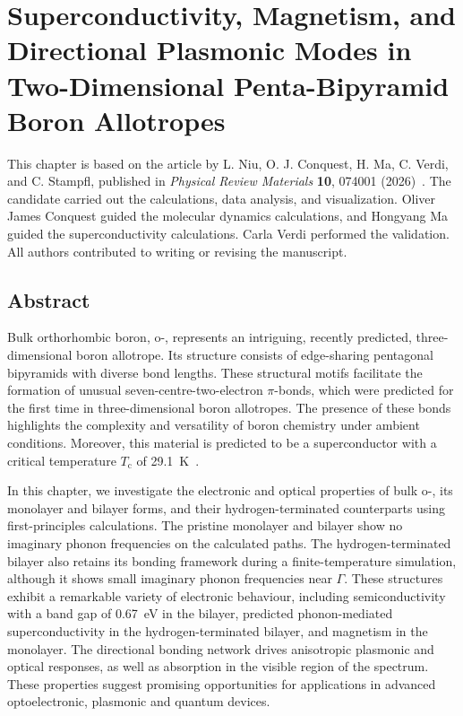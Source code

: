 \chapter[Functional Properties of Penta-Bipyramid Boron Phases]{Superconductivity, Magnetism, and Directional Plasmonic Modes in Two-Dimensional Penta-Bipyramid Boron Allotropes}
\label{cha:project_boron}

This chapter is based on the article by L. Niu, O. J. Conquest, H. Ma, C. Verdi, and C. Stampfl,
published in \textit{Physical Review Materials} \textbf{10}, 074001 (2026)~\cite{niu2026superconductivity}.
The candidate carried out the calculations, data analysis, and visualization.
Oliver James Conquest guided the molecular dynamics calculations,
and Hongyang Ma guided the superconductivity calculations.
Carla Verdi performed the validation.
All authors contributed to writing or revising the manuscript.

\FloatBarrier
\section{Abstract}
\label{2_abstract}

Bulk orthorhombic boron, o-, represents an intriguing, recently predicted,
three-dimensional boron allotrope.
Its structure consists of edge-sharing pentagonal bipyramids
with diverse bond lengths.
These structural motifs facilitate the formation of unusual seven-centre-two-electron $\pi$-bonds,
which were predicted for the first time in three-dimensional boron allotropes.
The presence of these bonds highlights the complexity and versatility of boron chemistry under ambient conditions.
Moreover, this material is predicted to be a superconductor with a critical temperature $T_\mathrm{c}$ of \qty{29.1}{K}~\cite{han2023superconducting}.

In this chapter, we investigate the electronic and optical properties of bulk o-,
its monolayer and bilayer forms,
and their hydrogen-terminated counterparts using first-principles calculations.
The pristine monolayer and bilayer show no imaginary phonon frequencies on the calculated paths.
The hydrogen-terminated bilayer also retains its bonding framework during a finite-temperature simulation,
although it shows small imaginary phonon frequencies near $\Gamma$.
These structures exhibit a remarkable variety of electronic behaviour,
including semiconductivity with a band gap of \qty{0.67}{\electronvolt} in the bilayer,
predicted phonon-mediated superconductivity in the hydrogen-terminated bilayer,
and magnetism in the monolayer.
The directional bonding network drives anisotropic plasmonic and optical responses,
as well as absorption in the visible region of the spectrum.
These properties suggest promising opportunities for applications in advanced optoelectronic, plasmonic and quantum devices.

